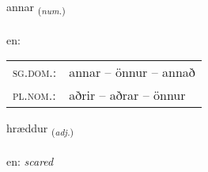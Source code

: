 \documentclass[frontgrid, backgrid]{flacards}\usepackage[]{graphicx}\usepackage[]{color}
\begin{document}
\renewcommand{\flhead}{\vskip5pt \fboxsep=0pt {\small\bfseries\footnotesize Töluorð | Numeral}}
\renewcommand{\fcfoot}{\vskip5pt \fboxsep=0pt \hspace{2pt}{\small\bfseries\footnotesize 2K}}

\renewcommand{\blhead}{\vskip5pt {\small\bfseries\footnotesize Töluorð | Numeral }}
\renewcommand{\bcfoot}{\vskip5pt \hspace{2pt}{\small\bfseries\footnotesize 2K}}


{annar \small{\textsubscript{(\textit{num.})}} \\[1ex] %
\textphonetic{[anar]} \\
en: \emph{} \\  [2ex]
\renewcommand*{\arraystretch}{0.8}
\begin{tabular}{ll}
\textsc{sg.dom.}: & annar  --  önnur -- annað \\ 
\textsc{pl.nom.}: & aðrir -- aðrar -- önnur
\end{tabular}
}

\renewcommand{\flhead}{\vskip5pt \fboxsep=0pt {\small\bfseries\footnotesize Lýsingarorð | Adjective}}
\renewcommand{\fcfoot}{\vskip5pt \fboxsep=0pt \hspace{2pt}{\small\bfseries\footnotesize 2K}}

\renewcommand{\blhead}{\vskip5pt {\small\bfseries\footnotesize Lýsingarorð | Adjective }}
\renewcommand{\bcfoot}{\vskip5pt \hspace{2pt}{\small\bfseries\footnotesize 2K}}


{hræddur \small{\textsubscript{(\textit{adj.})}} \\[1ex] %
\textphonetic{[r̥aitʏr]} \\
en: \emph{scared} \\  [2ex]
\renewcommand*{\arraystretch}{0.8}
}
\end{document}
